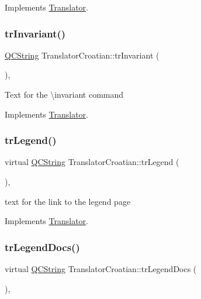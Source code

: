 Implements \mbox{\hyperlink{class_translator}{Translator}}.

\mbox{\label{class_translator_croatian_a44c8817e5ab5c325e5d5fad24bacf312}} 
\subsubsection{\texorpdfstring{trInvariant()}{trInvariant()}}
{\footnotesize\ttfamily \mbox{\hyperlink{class_q_c_string}{Q\+C\+String}} Translator\+Croatian\+::tr\+Invariant (\begin{DoxyParamCaption}{ }\end{DoxyParamCaption})\hspace{0.3cm}{\ttfamily [inline]}, {\ttfamily [virtual]}}

Text for the \textbackslash{}invariant command 

Implements \mbox{\hyperlink{class_translator}{Translator}}.

\mbox{\label{class_translator_croatian_ae5663c0e12e544f6e4f769496eaada6d}} 
\subsubsection{\texorpdfstring{trLegend()}{trLegend()}}
{\footnotesize\ttfamily virtual \mbox{\hyperlink{class_q_c_string}{Q\+C\+String}} Translator\+Croatian\+::tr\+Legend (\begin{DoxyParamCaption}{ }\end{DoxyParamCaption})\hspace{0.3cm}{\ttfamily [inline]}, {\ttfamily [virtual]}}

text for the link to the legend page 

Implements \mbox{\hyperlink{class_translator}{Translator}}.

\mbox{\label{class_translator_croatian_a85c56c6c507a473df17c1e1c0f66cd1e}} 
\subsubsection{\texorpdfstring{trLegendDocs()}{trLegendDocs()}}
{\footnotesize\ttfamily virtual \mbox{\hyperlink{class_q_c_string}{Q\+C\+String}} Translator\+Croatian\+::tr\+Legend\+Docs (\begin{DoxyParamCaption}{ }\end{DoxyParamCaption})\hspace{0.3cm}{\ttfamily [inline]}, {\ttfamily [virtual]}}

